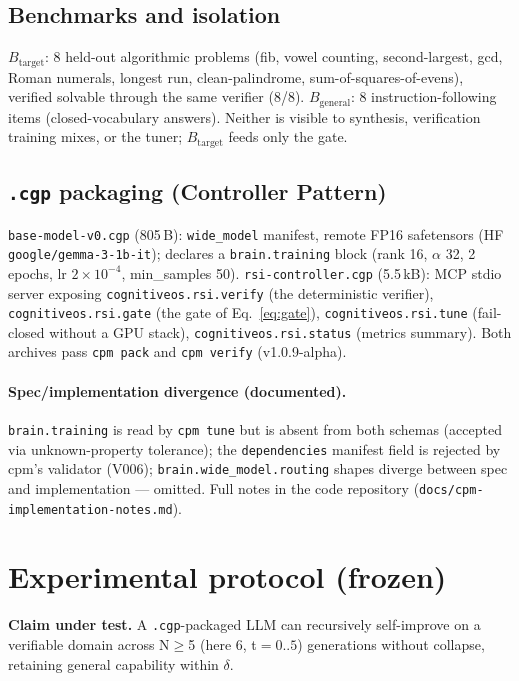 \documentclass[11pt,a4paper]{article}
\begin{document}
\subsection{Benchmarks and isolation}

$B_{\mathrm{target}}$: 8 held-out algorithmic problems (fib, vowel counting,
second-largest, gcd, Roman numerals, longest run, clean-palindrome,
sum-of-squares-of-evens), verified solvable through the same verifier (8/8).
$B_{\mathrm{general}}$: 8 instruction-following items (closed-vocabulary
answers). Neither is visible to synthesis, verification training mixes, or
the tuner; $B_{\mathrm{target}}$ feeds only the gate.

\subsection{\texttt{.cgp} packaging (Controller Pattern)}\label{sec:impl}

\texttt{base-model-v0.cgp} (805\,B): \texttt{wide\_model} manifest, remote FP16
safetensors (HF \texttt{google/gemma-3-1b-it}); declares a
\texttt{brain.training} block (rank 16, $\alpha$ 32, 2 epochs, lr $2\times
10^{-4}$, min\_samples 50). \texttt{rsi-controller.cgp} (5.5\,kB): MCP stdio
server exposing \texttt{cognitiveos.rsi.verify} (the deterministic verifier),
\texttt{cognitiveos.rsi.gate} (the gate of Eq.~\ref{eq:gate}),
\texttt{cognitiveos.rsi.tune} (fail-closed without a GPU stack),
\texttt{cognitiveos.rsi.status} (metrics summary). Both archives pass
\texttt{cpm pack} and \texttt{cpm verify} (v1.0.9-alpha).

\paragraph{Spec/implementation divergence (documented).}
\texttt{brain.training} is read by \texttt{cpm tune} but is absent from both
schemas (accepted via unknown-property tolerance); the \texttt{dependencies}
manifest field is rejected by cpm's validator (V006);
\texttt{brain.wide\_model.routing} shapes diverge between spec and
implementation --- omitted. Full
notes in the code repository (\texttt{docs/cpm-implementation-notes.md}).

\section{Experimental protocol (frozen)}\label{sec:protocol}

\textbf{Claim under test.} A \texttt{.cgp}-packaged LLM can recursively
self-improve on a verifiable domain across N$\ge$5 (here 6, t$=0..5$)
generations without collapse, retaining general capability within $\delta$.
\end{document}
